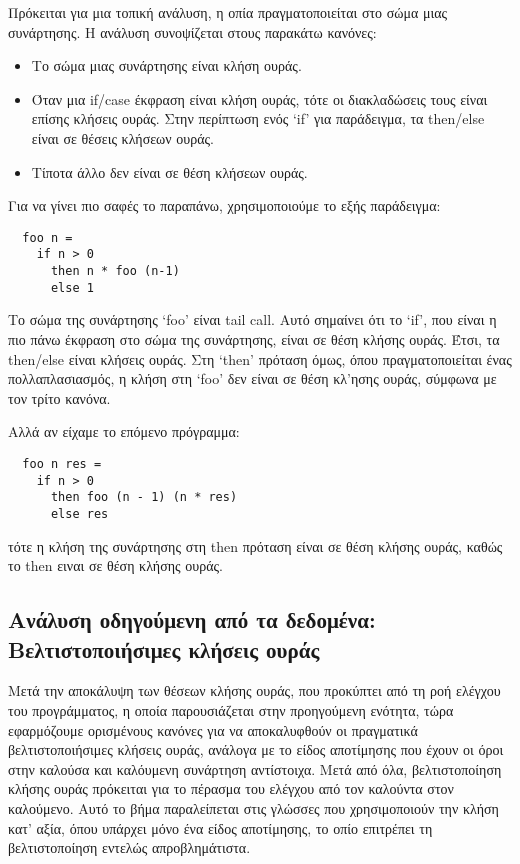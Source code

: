 \documentclass[diploma]{softlab-thesis}
\begin{document}
Πρόκειται για μια τοπική ανάλυση, η οπία πραγματοποιείται στο σώμα μιας συνάρτησης. Η ανάλυση συνοψίζεται στους παρακάτω κανόνες:
\begin{itemize}
  \item Το σώμα μιας συνάρτησης είναι κλήση ουράς.
  \item Όταν μια if/case έκφραση είναι κλήση ουράς, τότε οι διακλαδώσεις τους είναι επίσης κλήσεις ουράς.
  Στην περίπτωση ενός `if' για παράδειγμα, τα then/else είναι σε θέσεις κλήσεων ουράς.
  \item Τίποτα άλλο δεν είναι σε θέση κλήσεων ουράς.
\end{itemize}

Για να γίνει πιο σαφές το παραπάνω, χρησιμοποιούμε το εξής παράδειγμα:
\begin{verbatim}
  foo n = 
    if n > 0  
      then n * foo (n-1) 
      else 1
\end{verbatim}

Το σώμα της συνάρτησης `foo' είναι tail call. Αυτό σημαίνει ότι το `if', που είναι η πιο πάνω έκφραση στο σώμα της συνάρτησης, είναι σε θέση κλήσης ουράς.
Έτσι, τα then/else είναι κλήσεις ουράς. Στη `then' πρόταση όμως, όπου πραγματοποιείται ένας πολλαπλασιασμός, η κλήση στη `foo' δεν είναι σε θέση κλ'ησης ουράς, 
σύμφωνα με τον τρίτο κανόνα.

Αλλά αν είχαμε το επόμενο πρόγραμμα:
\begin{verbatim}
  foo n res = 
    if n > 0 
      then foo (n - 1) (n * res)
      else res
\end{verbatim}
τότε η κλήση της συνάρτησης στη then πρόταση είναι σε θέση κλήσης ουράς, καθώς το then ειναι σε θέση κλήσης ουράς.

\subsection{Ανάλυση οδηγούμενη από τα δεδομένα: Βελτιστοποιήσιμες κλήσεις ουράς}
\label{sec:data-driven-analysis-el}


Μετά την αποκάλυψη των θέσεων κλήσης ουράς, που προκύπτει από τη ροή ελέγχου του προγράμματος, η οποία παρουσιάζεται στην προηγούμενη ενότητα, 
τώρα εφαρμόζουμε ορισμένους κανόνες για να αποκαλυφθούν οι πραγματικά βελτιστοποιήσιμες κλήσεις ουράς, ανάλογα με το είδος αποτίμησης 
που έχουν οι όροι στην καλούσα και καλόυμενη συνάρτηση αντίστοιχα. 
Μετά από όλα, βελτιστοποίηση κλήσης ουράς πρόκειται για το πέρασμα του ελέγχου από τον καλούντα στον καλούμενο. 
Αυτό το βήμα παραλείπεται στις γλώσσες που χρησιμοποιούν την κλήση κατ' αξία, όπου υπάρχει
μόνο ένα είδος αποτίμησης, το οπίο επιτρέπει τη βελτιστοποίηση εντελώς απροβλημάτιστα.
\end{document}
